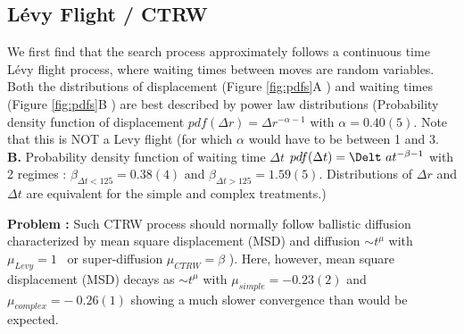 \subsection{L\'evy Flight / CTRW}
We first find that the search process approximately follows a continuous time L\'evy flight process, where waiting times between moves are random variables.  Both the distributions of displacement (Figure \ref{fig:pdfs}A ) and waiting times (Figure \ref{fig:pdfs}B ) are best described by power law distributions  (Probability density function of displacement $pdf(\Delta r) = \Delta r^{-\alpha -1}$ with $\alpha = 0.40(5)$.  Note that this is NOT a L\’evy flight (for which $\alpha$ would have to be between 1 and 3.  {\bf B.} Probability density function of waiting time $\Delta t$ $pdf(\Delta t) = \Delt\
a t^{-\beta -1}$ with 2 regimes : $\beta_{\Delta t < 125} = 0.38(4)$ and $\beta_{\Delta t > 125} = 1.59(5)$. Distributions of $\Delta r$ and $\Delta t$ are equivalent for the simple and complex treatments.)

{\bf Problem :} Such CTRW process should normally follow ballistic diffusion characterized by mean square displacement (MSD) and diffusion $\sim t^{\mu}$ with  $\mu_{Levy} = 1$ \
or super-diffusion $\mu_{CTRW} = \beta$ \cite{21,23}). Here, however, mean square displacement (MSD) decays as $\sim t^{\mu}$ with $\mu_{simple} =-0.23(2)$ and $\mu_{complex} =-\
 0.26(1)$ showing a much slower convergence than would be expected.





